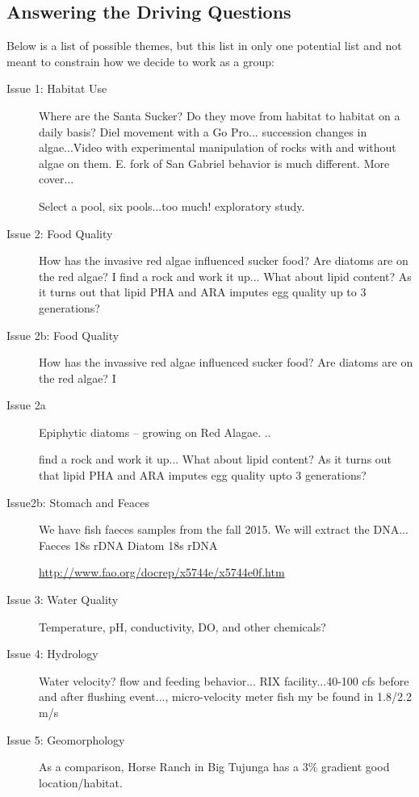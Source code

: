 \documentclass{tufte-handout}\usepackage[]{graphicx}\usepackage[]{color}
\begin{document}
\subsection{Answering the Driving Questions}




Below is a list of possible themes, but this list in only one potential list and not meant to constrain how we decide to work as a group: 

\begin{description}
  \item[Issue 1: Habitat Use] Where are the Santa Sucker?  Do they move from habitat to habitat on a daily basis? 
  Diel movement with a Go Pro... succession changes in algae...Video with experimental manipulation of rocks with and without algae on them. E. fork of San Gabriel behavior is much different. More cover...
  
  Select a pool, six pools...too much!  exploratory study.
  
  \item[Issue 2: Food Quality] How has the invasive red algae influenced sucker food? Are diatoms are on the red algae? I
  find a rock and work it up... What about lipid content?  As it turns out that lipid PHA and ARA imputes egg quality up to 3 generations? 

  \item[Issue 2b: Food Quality] How has the invassive red algae influenced sucker food? Are diatoms are on the red algae? I

  \item[Issue 2a] Epiphytic diatoms -- growing on Red Alagae. ..
  
  find a rock and work it up... What about lipid content?  As it turns out that lipid PHA and ARA imputes egg quality upto 3 generations? 

  \item[Issue2b: Stomach and Feaces] We have fish faeces samples from the fall 2015. We will extract the DNA...  Faeces 18s rDNA
  Diatom 18s rDNA

  
\href{http://www.fao.org/docrep/x5744e/x5744e0f.htm}{http://www.fao.org/docrep/x5744e/x5744e0f.htm}
  
  \item[Issue 3: Water Quality] Temperature, pH, conductivity, DO, and other chemicals?
  \item[Issue 4: Hydrology]Water velocity? flow and feeding behavior... RIX facility...40-100 cfs before and after flushing event..., micro-velocity meter fish my be found in 1.8/2.2 m/s
  \item[Issue 5: Geomorphology] As a comparison, Horse Ranch in Big Tujunga has a 3\% gradient good location/habitat.
\end{description}
\end{document}
